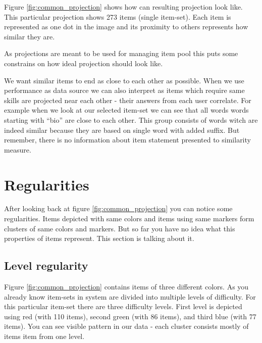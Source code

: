 \documentclass[
  digital, %
  table,   %
  nolof,     %
  nolot,     %
  nocover
]{fithesis3}
\begin{document}
Figure \ref{fig:common_projection} shows how can resulting projection look like. This particular projection shows 273 items (single item-set). Each item is represented as one dot in the image and its proximity to others represents how similar they are.


As projections are meant to be used for managing item pool this puts some constrains on how ideal projection should look like.

We want similar items to end as close to each other as possible. When we use performance as data source we can also interpret as items which require same skills are projected near each other - their answers from each user correlate. For example when we look at our selected item-set we can see that all words words starting with ``bio'' are close to each other. This group consists of words witch are indeed similar because they are based on single word with added suffix. But remember, there is no information about item statement presented to similarity measure.


\section{Regularities}\label{regularities}


After looking back at figure \ref{fig:common_projection} you can notice some regularities. Items depicted with same colors and items using same markers form clusters of same colors and markers. But so far you have no idea what this properties of items represent. This section is talking about it.

\subsection{Level regularity}\label{regularities-level-regularity}


Figure \ref{fig:common_projection} contains items of three different colors. As you already know item-sets in system \umimeCesky{} are divided into multiple levels of difficulty. For this particular item-set there are three difficulty levels. First level is depicted using red (with 110 items), second green (with 86 items), and third blue (with 77 items). You can see visible pattern in our data - each cluster consists mostly of items item from one level.
\end{document}
